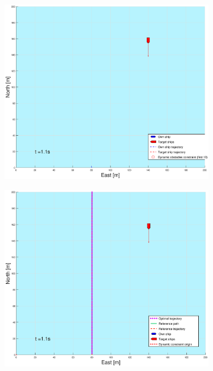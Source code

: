 \begin{figure}[!b] %
    \begin{subfigure}[b]{0.49\textwidth}
        \centering
        \includegraphics[width=\textwidth]{Images/Figures/sving_GW/_Simple_1fig1_time=1}
    \end{subfigure}
    \hfill
    \begin{subfigure}[b]{0.499\textwidth}
        \centering
        \includegraphics[width=\textwidth]{Images/Figures/sving_GW/_Simple_1fig999_time=1}

\end{subfigure}
\end{figure}
